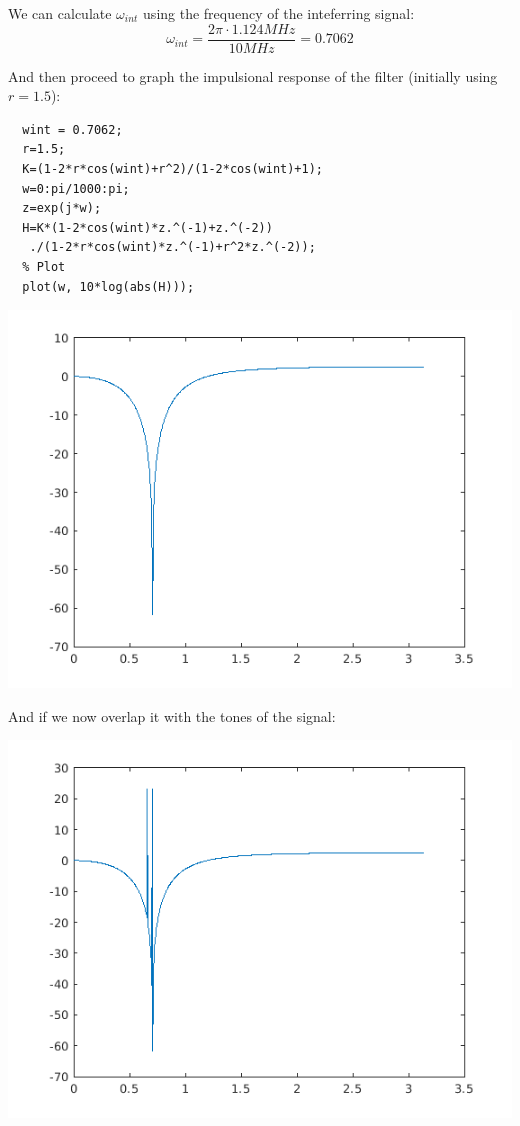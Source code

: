 \documentclass[conference,9pt]{IEEEtran}
\begin{document}
We can calculate $\omega_{int}$ using the frequency of the inteferring signal:
$$\omega_{int}=\frac{2\pi \cdot 1.124 MHz}{10 MHz} = 0.7062$$

And then proceed to graph the impulsional response of the filter (initially using $r=1.5$):

\begin{verbatim}
  wint = 0.7062;
  r=1.5;
  K=(1-2*r*cos(wint)+r^2)/(1-2*cos(wint)+1);
  w=0:pi/1000:pi;
  z=exp(j*w);
  H=K*(1-2*cos(wint)*z.^(-1)+z.^(-2))
   ./(1-2*r*cos(wint)*z.^(-1)+r^2*z.^(-2));
  % Plot
  plot(w, 10*log(abs(H)));
\end{verbatim}

\includegraphics[scale=0.6]{filter-response.png}

And if we now overlap it with the tones of the signal:

\includegraphics[scale=0.6]{complete-filter-res.png}
\end{document}
